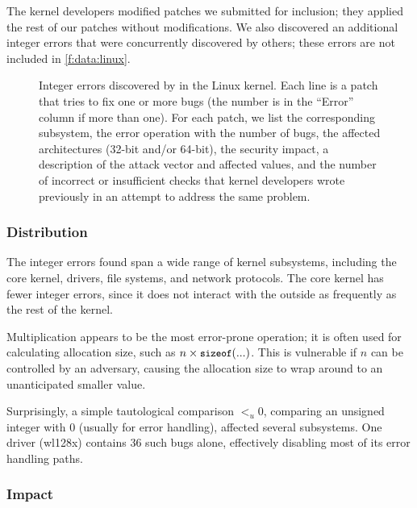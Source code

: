 The kernel developers modified \nrpatchesmod patches we submitted
for inclusion; they applied the rest of our patches without
modifications.
%
We also discovered an additional \nrbugsbyothers integer errors that
were concurrently discovered by others; these errors are not included
in \autoref{f:data:linux}.

\begin{figure*}
\centering
\footnotesize

\caption{Integer errors discovered by \sys in the Linux
kernel.  Each line is a patch that tries to fix one
or more bugs (the number is in the ``Error'' column if more than
one).  For each patch, we list the corresponding subsystem, the
error operation with the number of bugs, the affected architectures
(32-bit and/or 64-bit), the security impact, a
description of the attack vector and affected values, and the number
of incorrect or insufficient checks that kernel developers wrote
previously in an attempt to address the same problem.}
\label{f:data:linux}
\end{figure*}

\subsubsection{Distribution}

The integer errors \sys found span a wide range of kernel subsystems,
including the core kernel, drivers, file systems, and network protocols.
The core kernel has fewer integer errors, since it does not
interact with the outside as frequently as the rest of the kernel.

Multiplication appears to be the most error-prone operation; it is
often used for calculating allocation size, such as $n \times
\cc{sizeof}(...)$.  This is vulnerable if $n$ can be controlled
by an adversary, causing the allocation size to wrap around to an
unanticipated smaller value.

Surprisingly,  a simple tautological comparison $<_u 0$,
comparing an unsigned integer with 0 (usually for error handling),
affected several subsystems.
One driver (wl128x) contains 36 such bugs alone, effectively
disabling most of its error handling paths.

\subsubsection{Impact}

